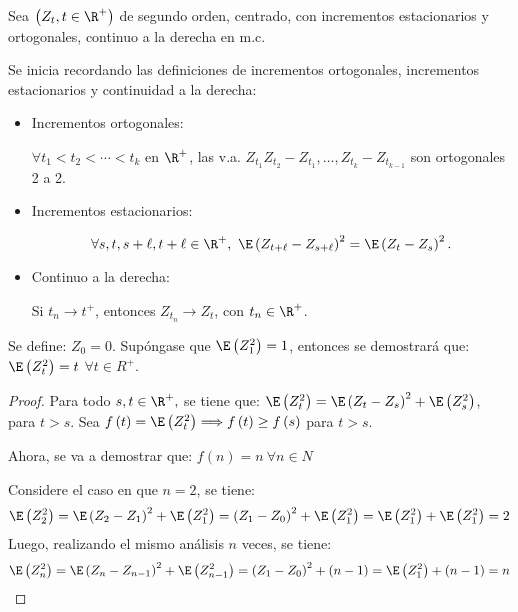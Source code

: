 \begin{ejemplo}
Sea $\left( Z_{t},t\in \R^{+} \right)$ de segundo orden, centrado, con incrementos estacionarios y ortogonales, continuo a la derecha en m.c. 

Se inicia recordando las definiciones de incrementos ortogonales, incrementos estacionarios y continuidad a la derecha:

\begin{itemize}
\item Incrementos ortogonales:\newline

$\forall t_{1}<t_{2}<\cdots <t_{k}$ en $\R^{+}$, las v.a. $Z_{t_{1}}Z_{t_{2}}-Z_{t_{1}},\ldots,Z_{t_{k}}-Z_{t_{k-1}}$ 
son ortogonales 2 a 2.

\item Incrementos estacionarios: 

\[
\forall s, t, s+\ell, t+\ell \in \R^{+},\ \E\left(Z_{t+\ell}-Z_{s+\ell} \right)^{2}=\E\left( Z_{t}-Z_{s} \right)^{2}.
\]

\item Continuo a la derecha:\newline

Si $t_{n}\to t^{+}$, entonces $Z_{t_{n}}\to Z_{t}$, con $t_{n}\in\R^{+}$.

\end{itemize}

\begin{itemize}
\item Se define: $Z_{0}=0$. Sup\'{o}ngase que $\E\left( Z_{1}^{2} \right)=1$, entonces se demostrar\'{a} que: $\E\left( Z_{t}^{2} \right)=t$ $\forall t\in R^{+}$.

\begin{proof} 
Para todo $s,t \in \R^{+},$ se tiene que: $\E\left( Z_{t}^{2} \right)=\E\left( Z_{t}-Z_{s} \right)^{2}+\E\left( Z_{s}^{2} \right)$, para $t>s$. Sea $f\left( t \right)=\E\left( Z_{t}^{2} \right)\Longrightarrow f\left( t \right)\geq f\left( s \right)$ para $t>s$.

\item Ahora, se va a demostrar que: $f\left( n \right)=n\ \forall n\in N$

Considere el caso en que $n=2$, se tiene:
\[
\E\left( Z_{2}^{2} \right)=\E\left( Z_{2}-Z_{1} \right)^{2}+\E\left( Z_{1}^{2} \right)=\left( Z_{1}-Z_{0} \right)^{2}+\E\left( Z_{1}^{2} \right)=\E\left( Z_{1}^{2} \right)+\E\left( Z_{1}^{2} \right)=2
\]
Luego, realizando el mismo an\'{a}lisis $n$ veces, se tiene:
\[
\E\left( Z_{n}^{2} \right)=\E\left( Z_{n}-Z_{n-1} \right)^{2}+\E\left( Z_{n-1}^{2} \right)=\left( Z_{1}-Z_{0} \right)^{2}+\left( n-1 \right)=\E\left( Z_{1}^{2} \right)+\left( n-1 \right)=n
\]


\end{proof}
\end{itemize}
\end{ejemplo}
